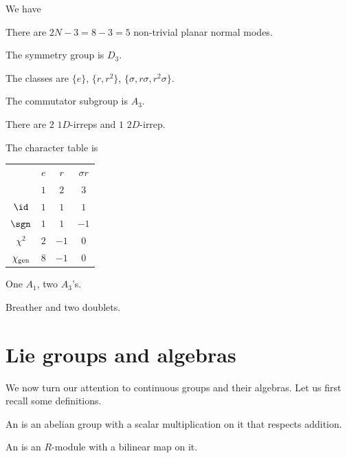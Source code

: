\documentclass[11pt]{article}
\begin{document}
\begin{eexample}
    We have
    \begin{itemize}
        \item There are $2N - 3 = 8 - 3 = 5$ non-trivial planar normal modes.
        \item The symmetry group is $D_3$.
        \item The classes are $\{ e \}$, $\{ r, r^2 \}$, $\{ \sigma, r \sigma, r^2 \sigma \}$.
        \item The commutator subgroup is $A_3$.
        \item There are $2$ $1D$-irreps and $1$ $2D$-irrep.
        \item The character table is
        \begin{table}[H]
            \centering
            \begin{tabular}{|c|c|c|c|}
                \hline
                 & $e$ & $r$ & $\sigma r$\\
                 & $1$ & $2$ & $3$\\
                \hline
                $\id$ & $1$ & $1$ & $1$\\
                $\sgn$ & $1$ & $1$ & $-1$\\
                $\chi^2$ & $2$ & $-1$ & $0$\\
                $\chi_{\rm gen}$ & $8$ & $-1$ & $0$\\
                \hline
            \end{tabular}
            \item One $A_1$, two $A_3$'s.
            \item Breather and two doublets.
        \end{table}
    \end{itemize}
\end{eexample}

\section{Lie groups and algebras}

We now turn our attention to continuous groups
and their algebras. Let us first recall some definitions.

\begin{definition}
    An  is an abelian group with a scalar
    multiplication on it that respects addition.
\end{definition}

\begin{definition}
    An  is an $R$-module with a bilinear
    map on it.
\end{definition}
\end{document}
